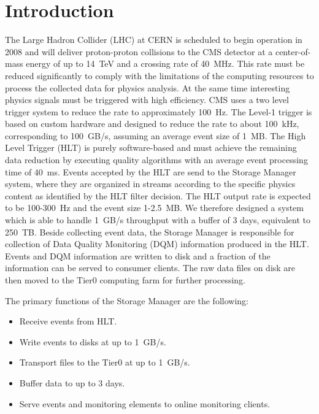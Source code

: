 
\section{\label{sec:intro}Introduction}

The Large Hadron Collider (LHC) at CERN is scheduled to begin operation in 2008 and will deliver proton-proton collisions to the CMS detector at a center-of-mass energy of up to 14~TeV and a crossing rate of 40~MHz. This rate must be reduced significantly to comply with the limitations of the computing resources to process the collected data for physics analysis. At the same time interesting physics signals must be triggered with high efficiency. CMS uses a two level trigger system to reduce the rate to approximately 100~Hz. The Level-1 trigger is based on custom hardware and designed to reduce the rate to about 100~kHz, corresponding to 100~GB/s, assuming an average event size of 1~MB. The High Level Trigger (HLT) is purely software-based and  must achieve the remaining data reduction by executing quality algorithms with an average event processing time of 40~ms. Events accepted by the HLT are send to the Storage Manager system, where they are organized in streams according to the specific physics content as identified by the HLT filter decision. The HLT output rate is expected to be 100-300~Hz and the event size 1-2.5~MB. We therefore designed a system which is able to handle 1~GB/s throughput with a buffer of 3 days, equivalent to 250~TB.
Beside collecting event data, the Storage Manager is responsible for collection of Data Quality Monitoring (DQM) information produced in the HLT. Events and DQM information are written to disk and a fraction of the information can be served to consumer clients. The raw data files on disk are then moved to the Tier0 computing farm for further processing. 

The primary functions of the Storage Manager are the following:
\begin{itemize}
\item Receive events from HLT.
\item Write events to disks at up to 1~GB/s.
\item Transport files to the Tier0 at up to 1~GB/s.
\item Buffer data to up to 3 days.
\item Serve events and monitoring elements to online monitoring clients.
\end{itemize}
